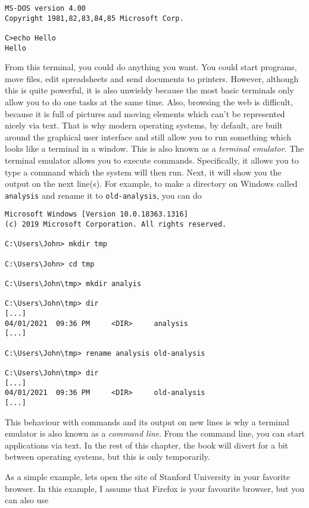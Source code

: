 \documentclass[
  14pt
  american,
  paper=a4,
  ,captions=tableheading
]{scrbook}
\newcommand{\passthrough}[1]{#1}
\begin{document}
\begin{lstlisting}
MS-DOS version 4.00
Copyright 1981,82,83,84,85 Microsoft Corp.

C>echo Hello
Hello
\end{lstlisting}

From this terminal, you could do anything you want. You could start
programs, move files, edit spreadsheets and send documents to printers.
However, although this is quite powerful, it is also unwieldy because
the most basic terminals only allow you to do one tasks at the same
time. Also, browsing the web is difficult, because it is full of
pictures and moving elements which can't be represented nicely via text.
That is why modern operating systems, by default, are built around the
graphical user interface and still allow you to run something which
looks like a terminal in a window. This is also known as a
\emph{terminal emulator}. The terminal emulator allows you to execute
commands. Specifically, it allows you to type a command which the system
will then run. Next, it will show you the output on the next line(s).
For example, to make a directory on Windows called
\passthrough{\lstinline!analysis!} and rename it to
\passthrough{\lstinline!old-analysis!}, you can do

\begin{lstlisting}
Microsoft Windows [Version 10.0.18363.1316]
(c) 2019 Microsoft Corporation. All rights reserved.

C:\Users\John> mkdir tmp

C:\Users\John> cd tmp

C:\Users\John\tmp> mkdir analyis

C:\Users\John\tmp> dir
[...]
04/01/2021  09:36 PM     <DIR>     analysis
[...]

C:\Users\John\tmp> rename analysis old-analysis

C:\Users\John\tmp> dir
[...]
04/01/2021  09:36 PM     <DIR>     old-analysis
[...]
\end{lstlisting}

This behaviour with commands and its output on new lines is why a
terminal emulator is also known as a \emph{command line}. From the
command line, you can start applications via text. In the rest of this
chapter, the book will divert for a bit between operating systems, but
this is only temporarily.

As a simple example, lets open the site of Stanford University in your
favorite browser. In this example, I assume that Firefox is your
favourite browser, but you can also use
\end{document}
